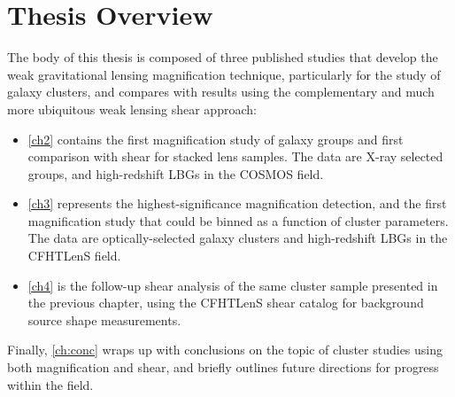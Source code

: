\section{Thesis Overview}
\label{sec:Overview}

The body of this thesis is composed of three published studies that develop the weak gravitational lensing magnification technique, particularly for the study of galaxy clusters, and compares with results using the complementary and much more ubiquitous weak lensing shear approach:
\begin{itemize}
\item \autoref{ch2} contains the first magnification study of galaxy groups and first comparison with shear for stacked lens samples. The data are X-ray selected groups, and high-redshift \ac{LBG}s in the \ac{COSMOS} field.
\item \autoref{ch3} represents the highest-significance magnification detection, and the first magnification study that could be binned as a function of cluster parameters. The data are optically-selected galaxy clusters and high-redshift \ac{LBG}s in the \ac{CFHTLenS} field.
\item \autoref{ch4} is the follow-up shear analysis of the same cluster sample presented in the previous chapter, using the \ac{CFHTLenS} shear catalog for background source shape measurements.
\end{itemize}
Finally, \autoref{ch:conc} wraps up with conclusions on the topic of cluster studies using both magnification and shear, and briefly outlines future directions for progress within the field.

\endinput
Any text after an \endinput is ignored.
You could put scraps here or things in progress.
